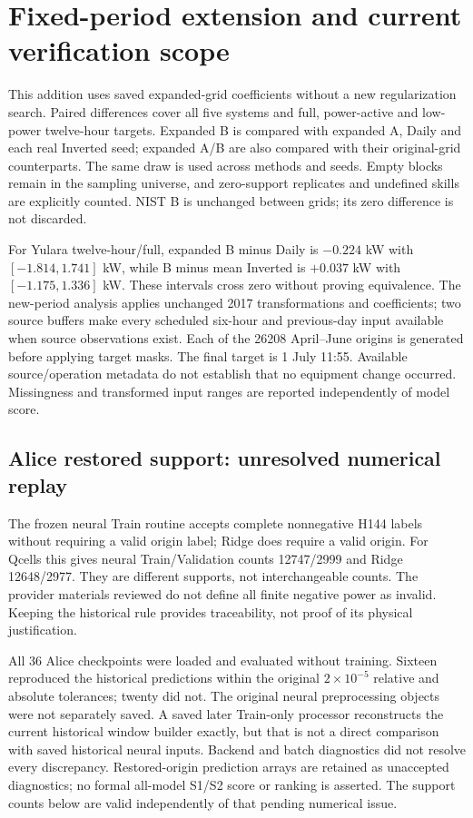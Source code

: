 \section{Fixed-period extension and current verification scope}
This addition uses saved expanded-grid coefficients without a new regularization search. Paired differences cover all five systems and full, power-active and low-power twelve-hour targets. Expanded B is compared with expanded A, Daily and each real Inverted seed; expanded A/B are also compared with their original-grid counterparts. The same draw is used across methods and seeds. Empty blocks remain in the sampling universe, and zero-support replicates and undefined skills are explicitly counted. NIST B is unchanged between grids; its zero difference is not discarded.

For Yulara twelve-hour/full, expanded B minus Daily is $-0.224$ kW with $[-1.814,1.741]$ kW, while B minus mean Inverted is $+0.037$ kW with $[-1.175,1.336]$ kW. These intervals cross zero without proving equivalence. The new-period analysis applies unchanged 2017 transformations and coefficients; two source buffers make every scheduled six-hour and previous-day input available when source observations exist. Each of the 26208 April--June origins is generated before applying target masks. The final target is 1 July 11:55. Available source/operation metadata do not establish that no equipment change occurred. Missingness and transformed input ranges are reported independently of model score.

\subsection{Alice restored support: unresolved numerical replay}
The frozen neural Train routine accepts complete nonnegative H144 labels without requiring a valid origin label; Ridge does require a valid origin. For Qcells this gives neural Train/Validation counts 12747/2999 and Ridge 12648/2977. They are different supports, not interchangeable counts. The provider materials reviewed do not define all finite negative power as invalid. Keeping the historical rule provides traceability, not proof of its physical justification.

All 36 Alice checkpoints were loaded and evaluated without training. Sixteen reproduced the historical predictions within the original $2\times10^{-5}$ relative and absolute tolerances; twenty did not. The original neural preprocessing objects were not separately saved. A saved later Train-only processor reconstructs the current historical window builder exactly, but that is not a direct comparison with saved historical neural inputs. Backend and batch diagnostics did not resolve every discrepancy. Restored-origin prediction arrays are retained as unaccepted diagnostics; no formal all-model S1/S2 score or ranking is asserted. The support counts below are valid independently of that pending numerical issue.


